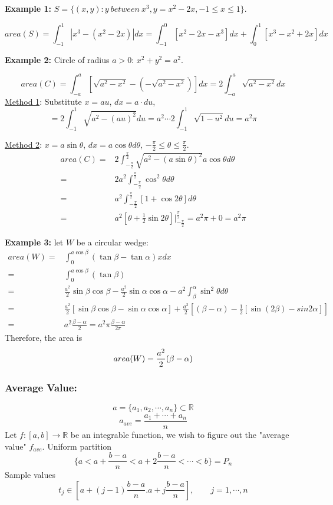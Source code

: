 \documentclass[12pt]{article}
\theoremstyle{plain}
\newcommand{\abs}[1]{\left| #1 \right|}
\newcommand{\mR}{{\mathbb{R}}}
\begin{document}
{\color{Brown}
\textbf{Example 1: }
$S = \{(x,y): y \ between \ x^3, y = x^2 - 2x, -1 \leq x \leq 1\}$. 

\[
	area (S) = \int_{-1}^1 \abs{x^3 - (x^2-2x)}dx 
	 = \int_{-1}^0 [x^2-2x-x^3]dx + \int_0^1 [x^3-x^2+2x]dx
\]


\textbf{Example 2: }
Circle of radius $a> 0$: $x^2+y^2 = a^2$. 

\[
	area(C) = \int_{-a}^a [\sqrt{a^2-x^2} - (-\sqrt{a^2-x^2})]dx
	 = 2\int_{-a}^a \sqrt{a^2-x^2}dx
\]
\underline{Method 1}: Substitute $x = au$, $dx=a\cdot du$, 
\[
	= 2\int_{-1}^1 \sqrt{a^2-(au)^2}du 
	= a^2 \cdots 2\int_{-1}^1\sqrt{1-u^2}du = a^2 \pi
\]

\underline{Method 2}: $x = a\sin \theta$, $dx = a\cos \theta d\theta$, 
$-\frac{\pi}2 \leq \theta \leq \frac{\pi}2$.
\begin{align*}
	area(C) 
	=& 2\int_{-\frac{\pi}2}^{\frac{\pi}2} 
	\sqrt{a^2-(a\sin \theta)^2} a\cos\theta d\theta\\
	=& 2a^2 \int_{-\frac{\pi}2}^{\frac{\pi}2} \cos^2\theta d\theta\\
	=& a^2 \int_{-\frac{\pi}2}^{\frac{\pi}2} [1+\cos2\theta] d\theta\\
	=& a^2 [\theta+\frac12 \sin 2\theta]
	\bigg\vert_{-\frac{\pi}2}^{\frac{\pi}2}
	= a^2\pi + 0 = a^2\pi
\end{align*}

\textbf{Example 3: }
let $W$ be a circular wedge: 
\begin{align*}
	area (W) 
	=& \int_0^{a\cos \beta} (\tan\beta -\tan \alpha) xdx\\
	=& \int_0^{a\cos \beta} (\tan \beta) \\
	=& \frac{a^2}2 \sin \beta \cos \beta - \frac{a^2}2 \sin \alpha \cos \alpha
	- a^2 \int_{\beta}^{\alpha} \sin^2 \theta d\theta\\
	=& \frac{a^2}2 [\sin\beta \cos \beta - \sin \alpha \cos \alpha]
	+ \frac{a^2}2 \left[(\beta - \alpha) - \frac 12 [\sin (2\beta) - 
	sin 2\alpha]  \right]\\
	=& a^2 \frac{\beta - \alpha}2 = a^2 \pi \frac{\beta - \alpha }{2\pi}
\end{align*}
Therefore, the area is 
\[
	area(W) = \frac{a^2}2 (\beta - \alpha)\\
\]
}

\subsubsection{Average Value: }
\[
	a = \{a_1, a_2, \cdots, a_n\} \subset \mR 
\]
\[
	a_{ave} = \frac{a_1 + \cdots + a_n}n 
\]
Let $f:[a,b]\to\mR$ be an integrable function, we wish to figure out 
the "average value" $f_{ave}$. Uniform partition 
\[
	\{a < a+\frac{b-a}n < a + 2\frac{b-a}n < \cdots < b\} = P_n
\]
Sample values
\[
	t_j \in [a+(j-1)\frac{b-a}n . a+j\frac{b-a}n], \qquad j = 1, \cdots, n
\]
\end{document}

